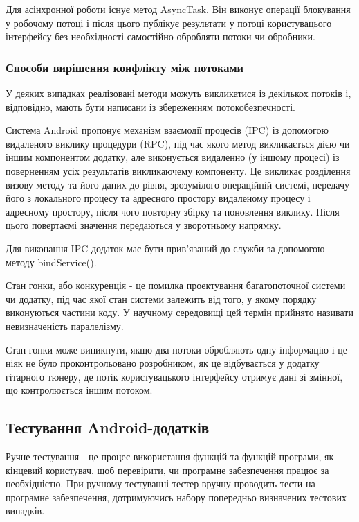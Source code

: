 Для асінхронної роботи існує метод AsyncTask. Він виконує операції блокування у робочому потоці і після цього публікує результати у потоці користувацього інтерфейсу без необхідності самостійно обробляти потоки чи обробники. \cite{androiddevelopers}

\subsubsection{Способи вирішення конфлікту між потоками}

У деяких випадках реалізовані методи можуть викликатися із декількох потоків і, відповідно, мають бути написани із збереженням потокобезпечності.

Система Android пропонує механізм взаємодії процесів (IPC) із допомогою видаленого виклику процедури (RPC), під час якого метод викликається дією чи іншим компонентом додатку, але виконується видаленно (у іншому процесі) із поверненням усіх результатів викликаючему компоненту. Це викликає розділення визову методу та його даних до рівня, зрозумілого операційній системі, передачу його з локального процесу та адресного простору видаленому процесу і адресному простору, після чого повторну збірку та поновлення виклику. Після цього повертаємі значення передаються у зворотньому напрямку. 

Для виконання IPC додаток має бути прив'язаний до служби за допомогою методу bindService(). \cite{androiddevelopers}

Стан гонки, або конкуренція - це помилка проектування багатопоточної системи чи додатку, під час якої стан системи залежить від того, у якому порядку виконуються частини коду. У научному середовищі цей термін прийнято називати невизначеність паралелізму. \cite{jonathan2005linux}

Стан гонки може виникнути, якщо два потоки обробляють одну інформацію і це ніяк не було проконтрольовано розробником, як це відбувається у додатку гітарного тюнеру, де потік користувацького інтерфейсу отримує дані зі змінної, що контролюється іншим потоком.

\subsection{Тестування Android-додатків}

Ручне тестування - це процес використання функцій та функцій програми, як кінцевий користувач, щоб перевірити, чи програмне забезпечення працює за необхідністю. При ручному тестуванні тестер вручну проводить тести на програмне забезпечення, дотримуючись набору попередньо визначених тестових випадків.

